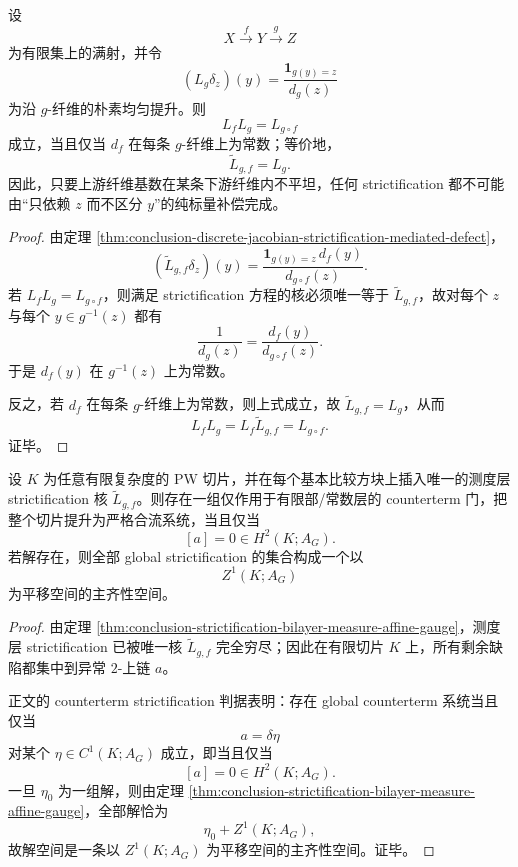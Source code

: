 \begin{proposition}[纯标量补偿的充要平坦判据]\label{prop:conclusion-strictification-pure-scalar-compensation-flatness}
设
\[
X\xrightarrow{f}Y\xrightarrow{g}Z
\]
为有限集上的满射，并令
\[
(L_g\delta_z)(y)=\frac{\mathbf 1_{g(y)=z}}{d_g(z)}
\]
为沿 \(g\)-纤维的朴素均匀提升。则
\[
L_fL_g=L_{g\circ f}
\]
成立，当且仅当 \(d_f\) 在每条 \(g\)-纤维上为常数；等价地，
\[
\widetilde L_{g,f}=L_g.
\]
因此，只要上游纤维基数在某条下游纤维内不平坦，任何 strictification 都不可能由“只依赖 \(z\) 而不区分 \(y\)”的纯标量补偿完成。
\end{proposition}
\begin{proof}
由定理 \ref{thm:conclusion-discrete-jacobian-strictification-mediated-defect}，
\[
(\widetilde L_{g,f}\delta_z)(y)
=
\frac{\mathbf 1_{g(y)=z}\,d_f(y)}{d_{g\circ f}(z)}.
\]
若 \(L_fL_g=L_{g\circ f}\)，则满足 strictification 方程的核必须唯一等于 \(\widetilde L_{g,f}\)，故对每个 \(z\) 与每个 \(y\in g^{-1}(z)\) 都有
\[
\frac1{d_g(z)}=\frac{d_f(y)}{d_{g\circ f}(z)}.
\]
于是 \(d_f(y)\) 在 \(g^{-1}(z)\) 上为常数。

反之，若 \(d_f\) 在每条 \(g\)-纤维上为常数，则上式成立，故 \(\widetilde L_{g,f}=L_g\)，从而
\[
L_fL_g=L_f\widetilde L_{g,f}=L_{g\circ f}.
\]
证毕。
\end{proof}

\begin{theorem}\label{thm:conclusion-finite-slice-strictification-unique-obstruction-class}
设 \(K\) 为任意有限复杂度的 PW 切片，并在每个基本比较方块上插入唯一的测度层 strictification 核 \(\widetilde L_{g,f}\)。则存在一组仅作用于有限部/常数层的 counterterm 门，把整个切片提升为严格合流系统，当且仅当
\[
[a]=0\in H^2(K;A_G).
\]
若解存在，则全部 global strictification 的集合构成一个以
\[
Z^1(K;A_G)
\]
为平移空间的主齐性空间。
\end{theorem}
\begin{proof}
由定理 \ref{thm:conclusion-strictification-bilayer-measure-affine-gauge}，测度层 strictification 已被唯一核 \(\widetilde L_{g,f}\) 完全穷尽；因此在有限切片 \(K\) 上，所有剩余缺陷都集中到异常 \(2\)-上链 \(a\)。

正文的 counterterm strictification 判据表明：存在 global counterterm 系统当且仅当
\[
a=\delta\eta
\]
对某个 \(\eta\in C^1(K;A_G)\) 成立，即当且仅当
\[
[a]=0\in H^2(K;A_G).
\]
一旦 \(\eta_0\) 为一组解，则由定理 \ref{thm:conclusion-strictification-bilayer-measure-affine-gauge}，全部解恰为
\[
\eta_0+Z^1(K;A_G),
\]
故解空间是一条以 \(Z^1(K;A_G)\) 为平移空间的主齐性空间。证毕。
\end{proof}

